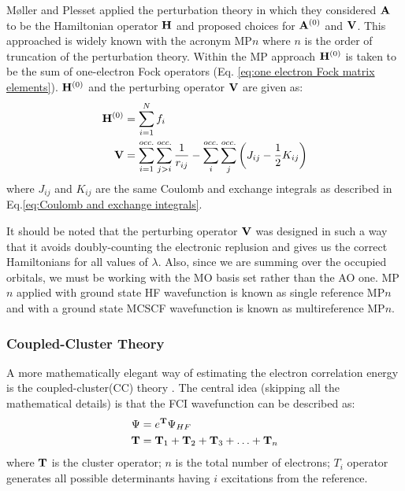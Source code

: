                 M\o{}ller and Plesset \cite{Moller1934} applied the perturbation theory in which they considered ${\mathbf {A}}$ to be the Hamiltonian operator ${\mathbf {H}}$ and proposed choices for ${\mathbf {A}}^{(0)}$ and ${\mathbf {V}}$. This approached is widely known with the acronym MP$n$ where $n$ is the order of truncation of the perturbation theory. Within the MP approach ${\mathbf {H}}^{(0)}$ is taken to be the sum of one-electron Fock operators (Eq. \eqref{eq:one electron Fock matrix elements}). ${\mathbf {H}}^{(0)}$ and the perturbing operator ${\mathbf {V}}$ are given as:
                \begin{equation}\label{eq:MP elements}
                    \begin{aligned}
                        {\mathbf {H}}^{(0)} &= \displaystyle\sum_{i=1}^N f_i\\
                        {\mathbf {V}} &= \displaystyle\sum_{i=1}^{occ.} \displaystyle\sum_{j > i}^{occ.} \frac{1}{r_{ij}} - \displaystyle\sum_{i}^{occ.} \displaystyle\sum_{j}^{occ.} \left (J_{ij} - \frac{1}{2} K_{ij} \right)
                    \end{aligned}
                \end{equation}
                where $J_{ij}$ and $K_{ij}$ are the same Coulomb and exchange integrals as described in Eq.\eqref{eq:Coulomb and exchange integrals}.

                It should be noted that the perturbing operator ${\mathbf {V}}$ was designed in such a way that it avoids doubly-counting the electronic replusion and gives us the correct Hamiltonians for all values of $\lambda$. Also, since we are summing over the occupied orbitals, we must be working with the MO basis set rather than the AO one. MP$n$ applied with ground state HF wavefunction is known as single reference MP$n$ and with a ground state MCSCF wavefunction is known as multireference MP$n$.

            \subsubsection{Coupled-Cluster Theory}\label{subsubsec:coupled-cluster theory}
                A more mathematically elegant way of estimating the electron correlation energy is the coupled-cluster(CC) theory \cite{Cizek1966}. The central idea (skipping all the mathematical details) is that the FCI wavefunction can be described as:
                \begin{equation}\label{eq:cc}
                    \begin{aligned}
                        \Psi &= e^{\mathbf {T}} \Psi_{HF}\\
                        {\mathbf {T}} &= {\mathbf {T}}_1 + {\mathbf {T}}_2 + {\mathbf {T}}_3 + \ldots + {\mathbf {T}}_n
                    \end{aligned}
                \end{equation}
                where ${\mathbf {T}}$ is the cluster operator; $n$ is the total number of electrons; $T_i$ operator generates all possible determinants having $i$ excitations from the reference.

